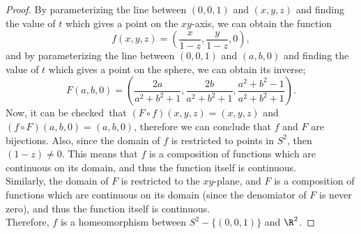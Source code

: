 \documentclass[letterpaper]{article}
\begin{document}
\begin{enumerate}
	\begin{proof}
	By parameterizing the line between $(0,0,1)$ and $(x,y,z)$ and finding the value of $t$ which gives a point on the $xy$-axis, we can obtain the function 
	$$f(x,y,z)=\left(\frac{x}{1-z}, \frac{y}{1-z}, 0\right),$$
	and by parameterizing the line between $(0,0,1)$ and $(a,b,0)$ and finding the value of $t$ which gives a point on the sphere, we can obtain its inverse;
	$$F(a,b,0)=\left(\frac{2a}{a^2+b^2+1}, \frac{2b}{a^2+b^2+1}, \frac{a^2+b^2-1}{a^2+b^2+1}\right).$$
	Now, it can be checked\footnotemark \ that $(F\circ f)(x,y,z)=(x,y,z)$ and $(f\circ F)(a,b,0)=(a,b,0)$, therefore we can conclude that $f$ and $F$ are bijections. Also, since the domain of $f$ is restricted to points in $S^2$, then $(1-z)\neq0$. This means that $f$ is a composition of functions which are continuous on its domain, and thus the function itself is continuous. \\
	Similarly, the domain of $F$ is restricted to the $xy$-plane, and $F$ is a composition of functions which are continuous on its domain (since the denomiator of $F$ is never zero), and thus the function itself is continuous.\\
	Therefore, $f$ is a homeomorphism between $S^2 −  \{(0,0,1)\}$ and $\R^2$.
	\end{proof}
	

\end{enumerate}
\end{document}
